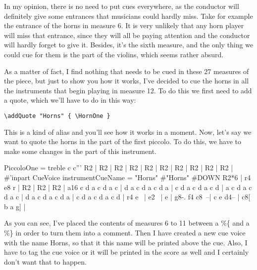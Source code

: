 \documentclass[../../LilyPond-Tutorials]{subfiles}
\begin{document}
In my opinion, there is no need to put cues everywhere, as the conductor will definitely give some entrances that musicians could hardly miss.
Take for example the entrance of the horns in measure 6.
It is very unlikely that any horn player will miss that entrance, since they will all be paying attention and the conductor will hardly forget to give it.
Besides, it's the sixth measure, and the only thing we could cue for them is the part of the violins, which seems rather absurd.

As a matter of fact, I find nothing that needs to be cued in these 27 measures of the piece, but just to show you how it works, I've decided to cue the horns in all the instruments that begin playing in measure 12.
To do this we first need to add a quote, which we'll have to do in this way:

\verb|\addQuote "Horns" { \HornOne }|

This is a kind of alias and you'll see how it works in a moment.
Now, let's say we want to quote the horns in the part of the first piccolo.
To do this, we have to make some changes in the part of this instrument.

\begin{lilypondcode}
PiccoloOne = {
       \clef treble
       \key c \major
       \relative c''' {
              \PersonalSettings
              R2 | %
              R2 | %
              R2 | %
              R2 | %
              R2 | %
                 R2 | %
                 R2 | %
                 R2 | %
                 R2 | %
                 R2 | %
              \tag #'inpart { \new CueVoice { \set instrumentCueName = "Horns" } }
              \cueDuring #"Horns" #DOWN { R2*6 } | %
              r4 e8 r | %
              R2 | %
              R2 | %
              R2 | %
              a16 c d a c d a c | %
              d a c d a c d a | %
              c d a c d a c d | %
              a c d a c d a c | %
              d a c d a c d a | %
              c d a c d a c d | %
              r4 e~ | %
              e2~ | %
              e | %
              g8-. f4 c8~--| %
              c e d4-- | %
              c8[ b a g] | %
       }
}
\end{lilypondcode}

As you can see, I've placed the contents of measures 6 to 11 between a \%\{ and a \%\} in order to turn them into a comment.
Then I have created a new cue voice with the name Horns, so that it this name will be printed above the cue.
Also, I have to tag the cue voice or it will be printed in the score as well and I certainly don't want that to happen.
\end{document}
